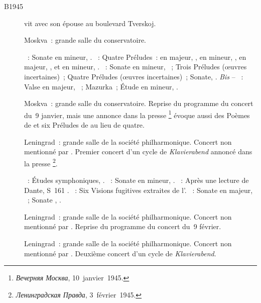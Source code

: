 \begin{description}
 \item[B1945]
 \VSofronitsky{} vit avec son épouse \VDushinova{} au boulevard Tverskoj.
 \item[]
 Moskva~: grande salle du conservatoire.

 \textsc{\Glazounov{}}~: Sonate en \kB \Flat mineur, .
 \textsc{\Rachmaninov{}}~: Quatre Préludes~: en \kC majeur, 
 , en \kA mineur,  , en \kG majeur, 
 , et en \kB \Flat mineur,  .
 \textsc{\Scriabine{}}~: Sonate en \kF \Sharp mineur, ~; Trois
 Préludes (œuvres incertaines)~; Quatre Préludes (œuvres incertaines)~;
 Sonate, .
 \emph{Bis} -- \textsc{\Scriabine{}}~: Valse en \kA \Flat majeur,
 ~; Mazurka~; Étude en \kD \Sharp mineur,  .
 \item[]
 Moskva~: grande salle du conservatoire.
 Reprise du programme du concert du~9 janvier, mais une annonce dans la
 presse%
 \footnote{\foreignlanguage{russian}{\emph{Вечерняя Москва}},
 10~janvier~1945.}
 évoque aussi des Poèmes de \Scriabine{} et six Préludes de \Rachmaninov{}
 au lieu de quatre.
 \item[]
 Leningrad~: grande salle de la société philharmonique.
 Concert non mentionné par \citet[p.~423]{Scriabine}.
 Premier concert d'un cycle de \emph{Klavierabend} annoncé dans la presse%
 \footnote{\foreignlanguage{russian}{\emph{Ленинградская Правда}},
 3~février~1945.}.

 \textsc{\Schumann{}}~: Études symphoniques, .
 \textsc{\Chopin{}}~: Sonate en \kB \Flat mineur, .
 \textsc{\Liszt{}}~: Après une lecture de Dante, S~161 .
 \textsc{\Prokofiev{}}~: Six Visions fugitives extraites de l'.
 \textsc{\Scriabine{}}~: Sonate  en \kF \Sharp majeur, ~;
 Sonate , .
 \item[]
 Leningrad~: grande salle de la société philharmonique.
 Concert non mentionné par \citet[p.~423]{Scriabine}.
 Reprise du programme du concert du~9 février.
 \item[]
 Leningrad~: grande salle de la société philharmonique.
 Concert non mentionné par \citet[p.~423]{Scriabine}.
 Deuxième concert d'un cycle de \emph{Klavierabend}.


\end{description}
